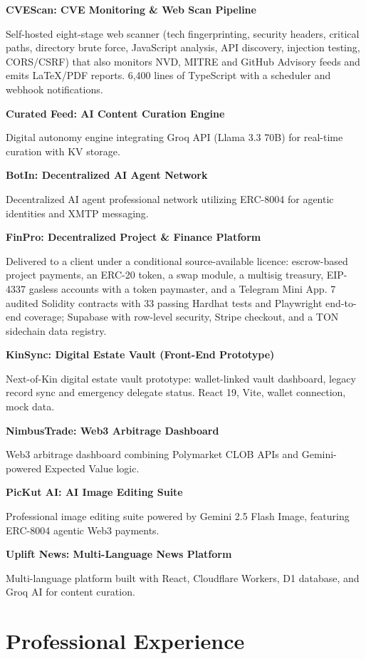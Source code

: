 \documentclass[10pt,a4paper]{article}
\newcommand{\project}[2]{%
  \par\vspace{0.55em}%
  {\sffamily\bfseries #1}%
  \hfill{\small\itshape #2}\par%
  \vspace{0.15em}%
}
\begin{document}
\project{CVEScan: CVE Monitoring \& Web Scan Pipeline}{}
\small Self-hosted eight-stage web scanner (tech fingerprinting, security headers, critical paths, directory brute force, JavaScript analysis, API discovery, injection testing, CORS/CSRF) that also monitors NVD, MITRE and GitHub Advisory feeds and emits LaTeX/PDF reports. 6,400 lines of TypeScript with a scheduler and webhook notifications.\normalsize

\project{Curated Feed: AI Content Curation Engine}{}
\small Digital autonomy engine integrating Groq API (Llama 3.3 70B) for real-time curation with KV storage.\normalsize

\project{BotIn: Decentralized AI Agent Network}{}
\small Decentralized AI agent professional network utilizing ERC-8004 for agentic identities and XMTP messaging.\normalsize

\project{FinPro: Decentralized Project \& Finance Platform}{}
\small Delivered to a client under a conditional source-available licence: escrow-based project payments, an ERC-20 token, a swap module, a multisig treasury, EIP-4337 gasless accounts with a token paymaster, and a Telegram Mini App. 7 audited Solidity contracts with 33 passing Hardhat tests and Playwright end-to-end coverage; Supabase with row-level security, Stripe checkout, and a TON sidechain data registry.\normalsize

\project{KinSync: Digital Estate Vault (Front-End Prototype)}{}
\small Next-of-Kin digital estate vault prototype: wallet-linked vault dashboard, legacy record sync and emergency delegate status. React 19, Vite, wallet connection, mock data.\normalsize

\project{NimbusTrade: Web3 Arbitrage Dashboard}{}
\small Web3 arbitrage dashboard combining Polymarket CLOB APIs and Gemini-powered Expected Value logic.\normalsize

\project{PicKut AI: AI Image Editing Suite}{}
\small Professional image editing suite powered by Gemini 2.5 Flash Image, featuring ERC-8004 agentic Web3 payments.\normalsize

\project{Uplift News: Multi-Language News Platform}{}
\small Multi-language platform built with React, Cloudflare Workers, D1 database, and Groq AI for content curation.\normalsize

\section{Professional Experience}
\end{document}
